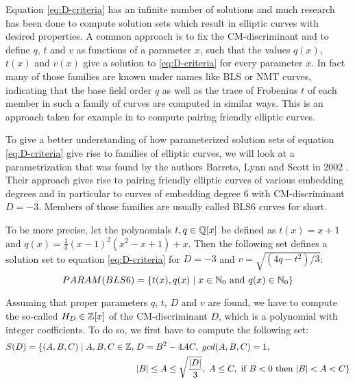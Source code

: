 Equation \ref{eq:D-criteria} has an infinite number of solutions and much research has been done to compute solution sets which result in elliptic curves with desired properties. A common approach is to fix the CM-discriminant and to define $q$, $t$ and $v$ as functions of a parameter $x$, such that the values $q(x)$, $t(x)$ and $v(x)$ give a solution to \ref{eq:D-criteria} for every parameter $x$. In fact many of those families are known under names like BLS \cite{bls-02} or NMT \cite{mnt-84} curves, indicating that the base field order $q$ as well as the trace of Frobenius $t$ of each member in such a family of curves are computed in similar ways. This is an approach taken for example in \cite{freeman-06} to compute pairing friendly elliptic curves.
\begin{example}
\label{ex:bls6-params} To give a better understanding of how parameterized solution sets of equation \ref{eq:D-criteria} give rise to families of elliptic curves, we will look at a parametrization that was found by the authors Barreto, Lynn and Scott in 2002 \cite{bls-02}. Their approach gives rise to pairing friendly elliptic curves of various embedding degrees and in particular to curves of embedding degree $6$ with CM-discriminant $D=-3$. Members of those families are usually called BLS6 curves for short. 

To be more precise, let the polynomials $t,q\in \mathbb{Q}[x]$ be defined as $t(x)=x+1$ and $q(x) = \frac{1}{3}(x-1)^2(x^2-x+1) + x$. Then the following set defines a solution set to equation \ref{eq:D-criteria} for $D=-3$ and $v= \sqrt{(4 q - t^2)/3}$: 
\begin{equation}
PARAM(BLS6) = \{t(x), q(x) \;|\; x\in \mathbb{N}_0 \text{ and } q(x)\in\mathbb{N}_0\}
\end{equation}  
\end{example}

Assuming that proper parameters $q$, $t$, $D$ and $v$ are found, we have to compute the so-called  $H_D\in \mathbb{Z}[x]$ of the CM-discriminant $D$, which is a polynomial with integer coefficients. To do so, we first have to compute the following set:
\begin{equation}
\begin{aligned}
\label{def:hilbert_class_domain}
S(D)=\{(A,B,C)\;|\; A,B,C\in\mathbb{Z},\; &D = B^2-4AC,\; gcd(A,B,C)=1, \\
&|B|\leq A \leq \sqrt{\frac{|D|}{3}},\; A\leq C, 
\text{ if } B< 0 \text{ then } |B| < A < C\}
\end{aligned}
\end{equation}

